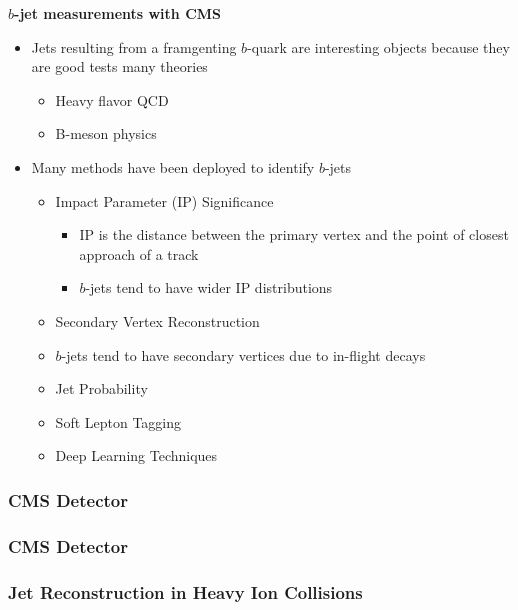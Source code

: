 \documentclass[9pt]{beamer}
\begin{document}
     \begin{frame}
       \centering \textbf{$b$-jet measurements with CMS}
       \begin{itemize}
       \item Jets resulting from a framgenting $b$-quark are interesting objects because they are good tests many theories
         \begin{itemize}
         \item Heavy flavor QCD
         \item B-meson physics
         \end{itemize}
       \item Many methods have been deployed to identify $b$-jets
         \begin{itemize}
         \item Impact Parameter (IP) Significance
           \begin{itemize}
           \item IP is the distance between the primary vertex and the point of closest approach of a track
           \item $b$-jets tend to have wider IP distributions
           \end{itemize}
         \item Secondary Vertex Reconstruction
           \item $b$-jets tend to have secondary vertices due to in-flight decays
         \item Jet Probability
         \item Soft Lepton Tagging
         \item Deep Learning Techniques
         \end{itemize}
       \end{itemize}
     \end{frame}

     \begin{frame}
       \frametitle{\textbf{CMS Detector}}
       \centering {}
     \end{frame}
     
     \begin{frame}
       \frametitle{\textbf{CMS Detector}}
       \centering {}
     \end{frame}

     \begin{frame}
       \frametitle{\textbf{Jet Reconstruction in Heavy Ion Collisions}}
     \end{frame}

     
\end{document}
